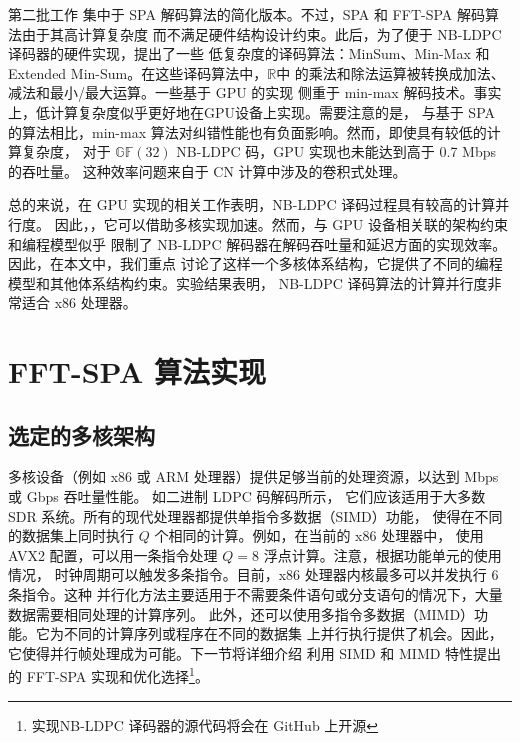 \documentclass{cjc}
\begin{document}
  第二批工作\cite{noauthor_wang_nodate,noauthor_thi_nodate,noauthor_pham_nodate}
  集中于 SPA 解码算法的简化版本。不过，SPA 和 FFT-SPA 解码算法由于其高计算复杂度
  而不满足硬件结构设计约束。此后，为了便于 NB-LDPC 译码器的硬件实现，提出了一些
  低复杂度的译码算法：MinSum\cite{declercq_decoding_2007}、Min-Max\cite{declercq_decoding_2007}
  和 Extended Min-Sum\cite{noauthor_voicila_nodate}。在这些译码算法中，$\mathbb{R}$中
  的乘法和除法运算被转换成加法、减法和最小/最大运算。一些基于 GPU 的实现\cite{noauthor_wang_nodate,noauthor_thi_nodate,noauthor_pham_nodate}
  侧重于 min-max 解码技术。事实上，低计算复杂度似乎更好地在GPU设备上实现。需要注意的是，
  与基于 SPA 的算法相比，min-max 算法对纠错性能也有负面影响。然而，即使具有较低的计算复杂度，
  对于 $\mathbb{GF}(32)$ NB-LDPC 码，GPU 实现也未能达到高于 0.7 Mbps 的吞吐量。
  这种效率问题来自于 CN 计算中涉及的卷积式处理。

  总的来说，在 GPU 实现的相关工作表明，NB-LDPC 译码过程具有较高的计算并行度。
  因此，，它可以借助多核实现加速。然而，与 GPU 设备相关联的架构约束和编程模型似乎
  限制了 NB-LDPC 解码器在解码吞吐量和延迟方面的实现效率。因此，在本文中，我们重点
  讨论了这样一个多核体系结构，它提供了不同的编程模型和其他体系结构约束。实验结果表明，
  NB-LDPC 译码算法的计算并行度非常适合 x86 处理器。

\section{FFT-SPA 算法实现}\label{sec:fftspa}
\subsection{选定的多核架构}

  多核设备（例如 x86 或 ARM 处理器）提供足够当前的处理资源，以达到 Mbps 或 Gbps 吞吐量性能。
  如二进制 LDPC 码\cite{gal_high-throughput_2016,gal_high-throughput_2015}解码所示，
  它们应该适用于大多数 SDR 系统。所有的现代处理器都提供单指令多数据（SIMD）功能，
  使得在不同的数据集上同时执行 $Q$ 个相同的计算。例如，在当前的 x86 处理器中，
  使用 AVX2 配置，可以用一条指令处理 $Q=8$ 浮点计算。注意，根据功能单元的使用情况，
  时钟周期可以触发多条指令。目前，x86 处理器内核最多可以并发执行 6 条指令。这种
  并行化方法主要适用于不需要条件语句或分支语句的情况下，大量数据需要相同处理的计算序列。
  此外，还可以使用多指令多数据（MIMD）功能。它为不同的计算序列或程序在不同的数据集
  上并行执行提供了机会。因此，它使得并行帧处理成为可能。下一节将详细介绍
  利用 SIMD 和 MIMD 特性提出的 FFT-SPA 实现和优化选择\footnote{实现NB-LDPC 译码器的源代码将会在 GitHub 上开源}。
\end{document}
